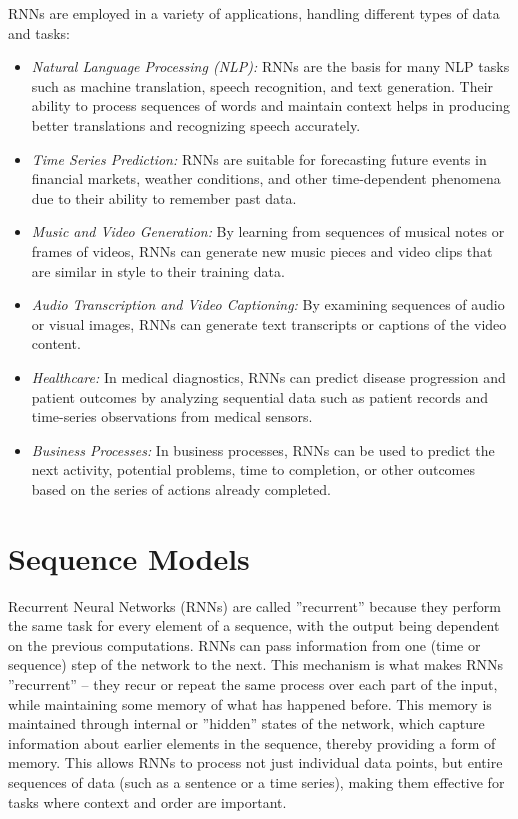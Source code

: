 RNNs are employed in a variety of applications, handling different types of data and tasks:
\begin{itemize}
\item \emph{Natural Language Processing (NLP):} RNNs are the basis for many NLP tasks such as machine translation, speech recognition, and text generation. Their ability to process sequences of words and maintain context helps in producing better translations and recognizing speech accurately.
\item \emph{Time Series Prediction:} RNNs are suitable for forecasting future events in financial markets, weather conditions, and other time-dependent phenomena due to their ability to remember past data.
\item \emph{Music and Video Generation:} By learning from sequences of musical notes or frames of videos, RNNs can generate new music pieces and video clips that are similar in style to their training data.
\item \emph{Audio Transcription and Video Captioning:} By examining sequences of audio or visual images, RNNs can generate text transcripts or captions of the video content.  
\item \emph{Healthcare:} In medical diagnostics, RNNs can predict disease progression and patient outcomes by analyzing sequential data such as patient records and time-series observations from medical sensors.
\item \emph{Business Processes:} In business processes, RNNs can be used to predict the next activity, potential problems, time to completion, or other outcomes based on the series of actions already completed.
\end{itemize}

\section{Sequence Models}

Recurrent Neural Networks (RNNs) are called ''recurrent'' because they perform the same task for every element of a sequence, with the output being dependent on the previous computations. RNNs can pass information from one (time or sequence) step of the network to the next. This mechanism is what makes RNNs ''recurrent'' -- they recur or repeat the same process over each part of the input, while maintaining some memory of what has happened before. This memory is maintained through internal or ''hidden'' states of the network, which capture information about earlier elements in the sequence, thereby providing a form of memory. This allows RNNs to process not just individual data points, but entire sequences of data (such as a sentence or a time series), making them effective for tasks where context and order are important.


